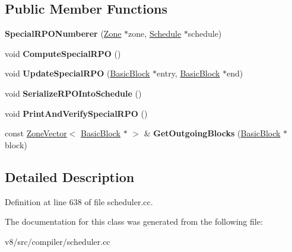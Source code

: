 \subsection*{Public Member Functions}
\begin{DoxyCompactItemize}
\item 
\mbox{\label{classv8_1_1internal_1_1compiler_1_1SpecialRPONumberer_ac9535b87ba2626cc8b93a87645315971}} 
{\bfseries Special\+R\+P\+O\+Numberer} (\mbox{\hyperlink{classv8_1_1internal_1_1Zone}{Zone}} $\ast$zone, \mbox{\hyperlink{classv8_1_1internal_1_1compiler_1_1Schedule}{Schedule}} $\ast$schedule)
\item 
\mbox{\label{classv8_1_1internal_1_1compiler_1_1SpecialRPONumberer_a345672f229561ea9aa11f7fc24547cfb}} 
void {\bfseries Compute\+Special\+R\+PO} ()
\item 
\mbox{\label{classv8_1_1internal_1_1compiler_1_1SpecialRPONumberer_ab66f2a21671fd63bd0bd4a05e075be0f}} 
void {\bfseries Update\+Special\+R\+PO} (\mbox{\hyperlink{classv8_1_1internal_1_1compiler_1_1BasicBlock}{Basic\+Block}} $\ast$entry, \mbox{\hyperlink{classv8_1_1internal_1_1compiler_1_1BasicBlock}{Basic\+Block}} $\ast$end)
\item 
\mbox{\label{classv8_1_1internal_1_1compiler_1_1SpecialRPONumberer_ab7814aee37c7bc4a48900ebaa98c1d40}} 
void {\bfseries Serialize\+R\+P\+O\+Into\+Schedule} ()
\item 
\mbox{\label{classv8_1_1internal_1_1compiler_1_1SpecialRPONumberer_a9787689e0b490cb784024788ece3af89}} 
void {\bfseries Print\+And\+Verify\+Special\+R\+PO} ()
\item 
\mbox{\label{classv8_1_1internal_1_1compiler_1_1SpecialRPONumberer_adc2d8528abbcb5572f1a6ebcdb268f6f}} 
const \mbox{\hyperlink{classv8_1_1internal_1_1ZoneVector}{Zone\+Vector}}$<$ \mbox{\hyperlink{classv8_1_1internal_1_1compiler_1_1BasicBlock}{Basic\+Block}} $\ast$ $>$ \& {\bfseries Get\+Outgoing\+Blocks} (\mbox{\hyperlink{classv8_1_1internal_1_1compiler_1_1BasicBlock}{Basic\+Block}} $\ast$block)
\end{DoxyCompactItemize}


\subsection{Detailed Description}


Definition at line 638 of file scheduler.\+cc.



The documentation for this class was generated from the following file\+:\begin{DoxyCompactItemize}
\item 
v8/src/compiler/scheduler.\+cc\end{DoxyCompactItemize}
